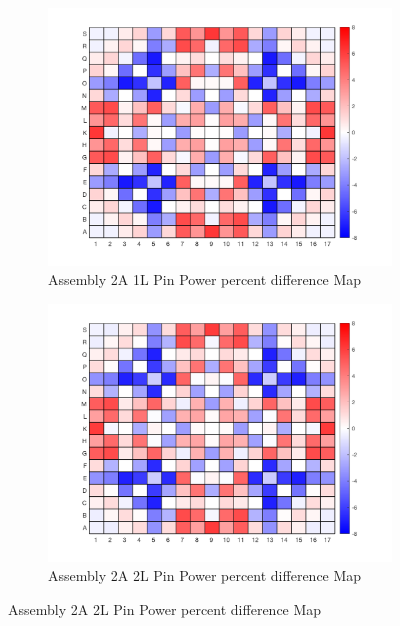 \documentclass[12pt]{article}
\begin{document}
\begin{figure}[htb!]

        \begin{subfigure}{.5\textwidth} %
            \centering
            \includegraphics[scale=0.46]{Figures/2A_1L_pinpowerDiff.png} 
            \caption{Assembly 2A 1L Pin Power percent difference Map}
            \label{fig:sub-first}
        \end{subfigure}
        \begin{subfigure}{.5\textwidth}
            \centering
            \includegraphics[scale=0.46]{Figures/2A_2L_pinpowerDiff.png} 
            \caption{Assembly 2A 2L Pin Power percent difference Map}
            \label{fig:sub-second}
        \end{subfigure}


\end{figure}
\end{document}
